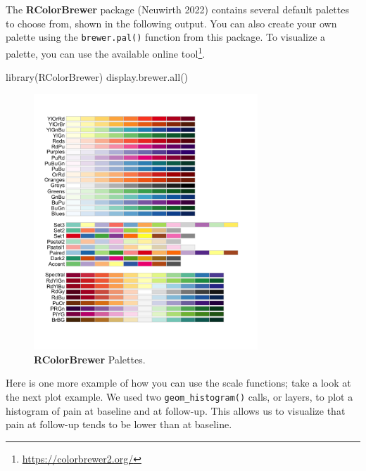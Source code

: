 \documentclass[
  letterpaper,
]{latex/krantz}
\makeatletter
\newenvironment{Shaded}{\begin{snugshade}}{\end{snugshade}}
\newcommand{\FunctionTok}[1]{\textcolor[rgb]{0.28,0.35,0.67}{#1}}
\newcommand{\NormalTok}[1]{\textcolor[rgb]{0.00,0.23,0.31}{#1}}
\renewcommand{\href}[2]{#2\footnote{\url{#1}}}
\newenvironment{kframe}{%
\medskip{}
\setlength{\fboxsep}{.8em}
 \def\at@end@of@kframe{}%
 \ifinner\ifhmode%
  \def\at@end@of@kframe{\end{minipage}}%
  \begin{minipage}{\columnwidth}%
 \fi\fi%
 \def\FrameCommand##1{\hskip\@totalleftmargin \hskip-\fboxsep
 \colorbox{shadecolor}{##1}\hskip-\fboxsep
     \hskip-\linewidth \hskip-\@totalleftmargin \hskip\columnwidth}%
 \MakeFramed {\advance\hsize-\width
   \@totalleftmargin\z@ \linewidth\hsize
   \@setminipage}}%
 {\par\unskip\endMakeFramed%
 \at@end@of@kframe}
\renewenvironment{Shaded}{\begin{kframe}}{\end{kframe}}
\makeatother
\begin{document}
The \textbf{RColorBrewer} package 
(Neuwirth 2022) contains several default palettes to choose from, shown
in the following output. You can also create your own palette using the
\texttt{brewer.pal()}
function from this package. To visualize a palette, you can use the
available \href{https://colorbrewer2.org/}{online tool}.

\begin{Shaded}
\begin{Highlighting}[]
\FunctionTok{library}\NormalTok{(RColorBrewer)}
\FunctionTok{display.brewer.all}\NormalTok{()}
\end{Highlighting}
\end{Shaded}

\begin{figure}[H]

{\centering \includegraphics[width=0.75\textwidth,height=\textheight]{book/images/visualization_ggplot/palettes.png}

}

\caption{\textbf{RColorBrewer} Palettes.}

\end{figure}%

Here is one more example of how you can use the scale functions; take a
look at the next plot example. We used two \texttt{geom\_histogram()}
calls, or layers, to plot a histogram of pain at baseline and at
follow-up. This allows us to visualize that pain at follow-up tends to
be lower than at baseline.
\end{document}
